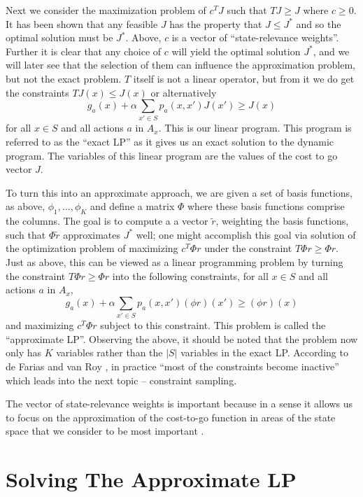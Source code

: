 \documentclass[12pt,reqno]{amsart}
\numberwithin{equation}{section}
\begin{document}
Next we consider the maximization problem of $c^T J$ such that $TJ \geq J$ where $c \geq 0$. It has been shown that any feasible $J$ has the property that $J \leq J^*$ and so the optimal solution must be $J^*$. Above, $c$ is a vector of ``state-relevance weights''. Further it is clear that any choice of $c$ will yield the optimal solution $J^*$, and we will later see that the selection of them can influence the approximation problem, but not the exact problem. $T$ itself is not a linear operator, but from it we do get the constraints $TJ(x) \leq J(x)$ or alternatively 
$$
g_a(x) + \alpha \sum_{x' \in S} p_a(x,x')J(x') \geq J(x)
$$
for all $x \in S$ and all actions $a$ in $A_x$. This is our linear program. This program is referred to as the ``exact LP'' as it gives us an exact solution to the dynamic program. The variables of this linear program are the values of the cost to go vector $J$.

To turn this into an approximate approach, we are given a set of basis functions, as above, $\phi_1,\dots,\phi_K$ and define a matrix $\Phi$ where these basis functions comprise the columns. The goal is to compute a a vector $\tilde{r}$, weighting the basis functions, such that $\Phi \tilde{r}$ approximates $J^*$ well; one might accomplish this goal via solution of the optimization problem of maximizing $c^T \Phi r$ under the constraint $T \Phi r \geq \Phi r$. Just as above, this can be viewed as a linear programming problem by turning the constraint $T \Phi r \geq \Phi r$ into the following constraints, for all $x \in S$ and all actions $a$ in $A_x$,
$$
g_a(x) + \alpha \sum_{x' \in S} p_a(x,x') (\phi r)(x') \geq (\phi r)(x)
$$
and maximizing $c^T \Phi r$ subject to this constraint. This problem is called the ``approximate LP''. Observing the above, it should be noted that the problem now only has $K$ variables rather than the $|S|$ variables in the exact LP.  According to de Farias and van Roy \cite{FV}, in practice ``most of the constraints become inactive'' which leads into the next topic -- constraint sampling.

The vector of state-relevance weights is important because in a sense it allows us to focus on the approximation of the cost-to-go function in areas of the state space that we consider to be most important \cite{FV}.

\section{Solving The Approximate LP}
\end{document}
